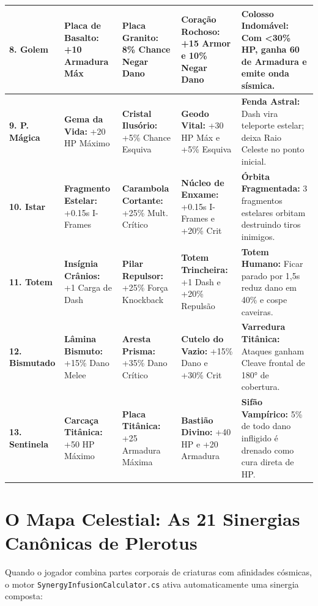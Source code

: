 \documentclass[a4paper,12pt]{report}
\begin{document}
{\begin{tabular}{|l|p{3.5cm}|p{3.5cm}|p{3.5cm}|p{4.2cm}|}
    \hline
    \textbf{8. Golem} & \textbf{Placa de Basalto:} +10 Armadura Máx & \textbf{Placa Granito:} 8\% Chance Negar Dano & \textbf{Coração Rochoso:} +15 Armor e 10\% Negar Dano & \textbf{Colosso Indomável:} Com <30\% HP, ganha 60 de Armadura e emite onda sísmica. \\
    \hline
    \textbf{9. P. Mágica} & \textbf{Gema da Vida:} +20 HP Máximo & \textbf{Cristal Ilusório:} +5\% Chance Esquiva & \textbf{Geodo Vital:} +30 HP Máx e +5\% Esquiva & \textbf{Fenda Astral:} Dash vira teleporte estelar; deixa Raio Celeste no ponto inicial. \\
    \hline
    \textbf{10. Istar} & \textbf{Fragmento Estelar:} +0.15s I-Frames & \textbf{Carambola Cortante:} +25\% Mult. Crítico & \textbf{Núcleo de Enxame:} +0.15s I-Frames e +20\% Crit & \textbf{Órbita Fragmentada:} 3 fragmentos estelares orbitam destruindo tiros inimigos. \\
    \hline
    \textbf{11. Totem} & \textbf{Insígnia Crânios:} +1 Carga de Dash & \textbf{Pilar Repulsor:} +25\% Força Knockback & \textbf{Totem Trincheira:} +1 Dash e +20\% Repulsão & \textbf{Totem Humano:} Ficar parado por 1,5s reduz dano em 40\% e cospe caveiras. \\
    \hline
    \textbf{12. Bismutado} & \textbf{Lâmina Bismuto:} +15\% Dano Melee & \textbf{Aresta Prisma:} +35\% Dano Crítico & \textbf{Cutelo do Vazio:} +15\% Dano e +30\% Crit & \textbf{Varredura Titânica:} Ataques ganham Cleave frontal de 180° de cobertura. \\
    \hline
    \textbf{13. Sentinela} & \textbf{Carcaça Titânica:} +50 HP Máximo & \textbf{Placa Titânica:} +25 Armadura Máxima & \textbf{Bastião Divino:} +40 HP e +20 Armadura & \textbf{Sifão Vampírico:} 5\% de todo dano infligido é drenado como cura direta de HP. \\
    \hline
\end{tabular}
}

\section{O Mapa Celestial: As 21 Sinergias Canônicas de Plerotus}
Quando o jogador combina partes corporais de criaturas com afinidades cósmicas, o motor \texttt{SynergyInfusionCalculator.cs} ativa automaticamente uma sinergia composta:
\end{document}
